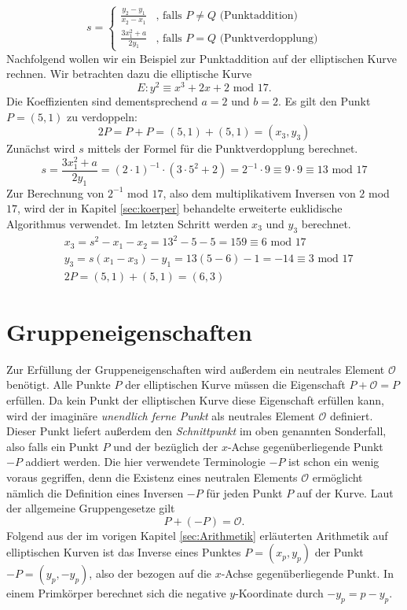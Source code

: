 $$s = \begin{cases}
	\frac{y_2 - y_1}{x_2 -x_1} & \text{, falls } P \neq Q \text{ (Punktaddition)}\\
	\frac{3x_1^2 + a}{2y_1} & \text{, falls } P = Q \text{ (Punktverdopplung)}
	\end{cases}
$$
\vspace{\baselineskip}
Nachfolgend wollen wir ein Beispiel zur Punktaddition auf der elliptischen Kurve rechnen. Wir betrachten dazu die elliptische Kurve $$E : y^2 \equiv x^3 +2x +2 \text{ mod } 17.$$ Die Koeffizienten sind dementsprechend $a=2$ und $b=2$. Es gilt den Punkt $P = (5,1)$ zu verdoppeln:
$$2P = P + P = (5,1) + (5,1) = (x_3, y_3)$$
Zunächst wird $s$ mittels der Formel für die Punktverdopplung berechnet.
$$s = \frac{3x_1^2 + a}{2y_1} = (2 \cdot 1)^{-1} \cdot ( 3 \cdot 5^2 + 2) = 2^{-1} \cdot 9 \equiv 9 \cdot 9 \equiv 13 \text{ mod } 17$$
Zur Berechnung von $2^{-1}$ mod $17$, also dem multiplikativem Inversen von $2$ mod $17$, wird der in Kapitel \ref{sec:koerper} behandelte erweiterte euklidische Algorithmus verwendet. Im letzten Schritt werden $x_3$ und $y_3$ berechnet.
\begin{align*}
&x_3 = s^2 - x_1 - x_2 = 13^2 -5 -5 = 159 \equiv 6 \text{ mod } 17\\
&y_3 = s(x_1 - x_3) - y_1 = 13(5-6) -1 = -14 \equiv 3 \text{ mod } 17\\
&2P = (5,1) + (5,1) = (6,3)
\end{align*}







\section{Gruppeneigenschaften} \label{sec:Gruppeneigenschaften}
Zur Erfüllung der Gruppeneigenschaften wird außerdem ein neutrales Element $\mathcal{O}$ benötigt. Alle Punkte $P$ der elliptischen Kurve müssen die Eigenschaft $P + \mathcal{O} = P$ erfüllen. Da kein Punkt der elliptischen Kurve diese Eigenschaft erfüllen kann, wird der imaginäre \textit{unendlich ferne Punkt} als neutrales Element $\mathcal{O}$ definiert. Dieser Punkt liefert außerdem den \textit{Schnittpunkt} im oben genannten Sonderfall, also falls ein Punkt $P$ und der bezüglich der $x$-Achse gegenüberliegende Punkt $-P$ addiert werden. Die hier verwendete Terminologie $-P$ ist schon ein wenig voraus gegriffen, denn die Existenz eines neutralen Elements $\mathcal{O}$ ermöglicht nämlich die Definition eines Inversen $-P$ für jeden Punkt $P$ auf der Kurve. Laut der allgemeine Gruppengesetze gilt $$P + (-P) = \mathcal{O}.$$
Folgend aus der im vorigen Kapitel \ref{sec:Arithmetik} erläuterten Arithmetik auf elliptischen Kurven ist das Inverse eines Punktes $P = (x_p, y_p)$ der Punkt $-P = (y_p, -y_p)$, also der bezogen auf die $x$-Achse gegenüberliegende Punkt. In einem Primkörper berechnet sich die negative $y$-Koordinate durch $-y_p = p - y_p$.\cite[279]{Paar.2016}

